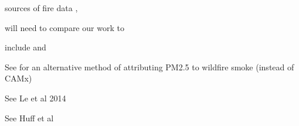 sources of fire data \cite{http://www.nifc.gov/fireInfo/fireInfo_main.html}, \cite{https://fam.nwcg.gov/fam-web/}

will need to compare our work to \cite{fann_health_2017}

include \cite{westerling_increasing_2016,WesterlingCorrection2016} and \cite{abatzoglou_impact_2016}

See \cite{Kaulfus2017} for an alternative method of attributing PM2.5 to wildfire smoke (instead of CAMx)

See Le et al 2014 \cite{http://dx.doi.org/10.3390/ijgi3020713}

See Huff et al \cite{http://dx.doi.org/10.4137/EHI.S19590}